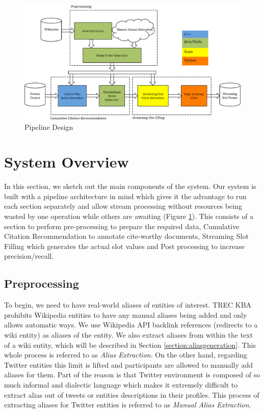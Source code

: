 
\begin{figure}
\centering
\includegraphics[width=6in]{./images/sdl-eps-converted-to.pdf}
\vspace*{-.1in} \caption{Pipeline Design }\label{fig:system}
\vspace*{-.2in}
\end{figure}

\section{System Overview}

In this section, we sketch out the main components of the system. Our system is built with a pipeline architecture in mind which gives it the advantage to run each section separately and allow stream processing without resources being wasted by one operation while others are awaiting (Figure \ref{fig:system}). This consists of a section to perform pre-processing to prepare the required data, Cumulative Citation Recommendation to annotate cite-worthy documents, Streaming Slot Filling which generates the actual slot values and Post processing to increase precision/recall. 


\subsection{Preprocessing}

To begin, we need to have real-world aliases of entities of interest. TREC KBA prohibits Wikipedia entities to have any manual aliases being added and only allows automatic ways. We use Wikipedia API backlink references (redirects to a wiki entity) as aliases of the entity. We also extract  aliases from within the text of a wiki entity, which will be described in Section \ref{section:aliasgeneration}. This whole process is referred to as \textit{Alias Extraction}. On the other hand, regarding Twitter entities this limit is lifted and participants are allowed to manually add aliases for them. Part of the reason is that Twitter environment is composed of so much informal and dialectic language which makes it extremely difficult to extract alias out of tweets or entities descriptions in their profiles. This process of extracting aliases for Twitter entities is referred to as \textit{Manual Alias Extraction}.


